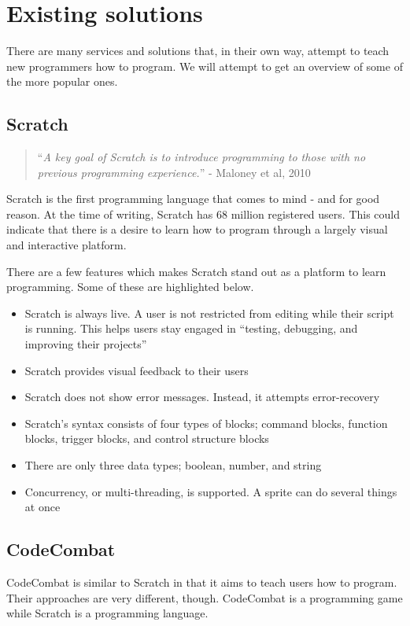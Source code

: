 \section{Existing solutions}
There are many services and solutions that, in their own way, attempt to teach new programmers how to program. We will attempt to get an overview of some of the more popular ones.

\subsection{Scratch}\label{ScratchSection}
\begin{quote}
    ``\emph{A key goal of Scratch is to introduce programming to those with no previous programming experience.}'' - Maloney et al, 2010\cite{maloneyScratchProgrammingLanguage2010}
\end{quote}

Scratch\cite{ScratchImagineProgram} is the first programming language that comes to mind - and for good reason. At the time of writing, Scratch has 68 million registered users\cite{ScratchImagineProgramStatistics}. This could indicate that there is a desire to learn how to program through a largely visual and interactive platform.


There are a few features which makes Scratch stand out as a platform to learn programming. Some of these are highlighted below.
\begin{itemize}
    \item Scratch is always live. A user is not restricted from editing while their script is running. This helps users stay engaged in ``testing, debugging, and improving their projects''
    \item Scratch provides visual feedback to their users
    \item Scratch does not show error messages. Instead, it attempts error-recovery
    \item Scratch's syntax consists of four types of blocks; command blocks, function blocks, trigger blocks, and control structure blocks
    \item There are only three data types; boolean, number, and string
    \item Concurrency, or multi-threading, is supported. A sprite can do several things at once
\end{itemize}\cite{maloneyScratchProgrammingLanguage2010}

\subsection{CodeCombat}\label{CodeCombatSection}
CodeCombat is similar to Scratch in that it aims to teach users how to program.
Their approaches are very different, though. CodeCombat is a programming game while Scratch is a programming language.

